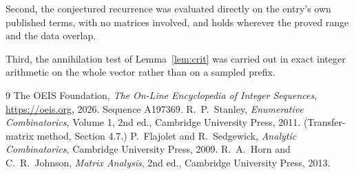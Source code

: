 \documentclass[11pt,a4paper]{article}
\theoremstyle{plain}
\theoremstyle{definition}
\begin{document}
Second, the conjectured recurrence was evaluated directly on the entry's own published terms,
with no matrices involved, and holds wherever the proved range and the data overlap.

Third, the annihilation test of Lemma~\ref{lem:crit} was carried out in exact integer
arithmetic on the whole vector rather than on a sampled prefix.

\begin{thebibliography}{9}
 The OEIS Foundation, \emph{The On-Line Encyclopedia of Integer
Sequences}, \url{https://oeis.org}, 2026. Sequence A197369.
 R.~P.~Stanley, \emph{Enumerative Combinatorics}, Volume 1, 2nd ed.,
Cambridge University Press, 2011. (Transfer-matrix method, Section 4.7.)
 P.~Flajolet and R.~Sedgewick, \emph{Analytic Combinatorics}, Cambridge
University Press, 2009.
 R.~A.~Horn and C.~R.~Johnson, \emph{Matrix Analysis}, 2nd ed., Cambridge
University Press, 2013.
\end{thebibliography}
\end{document}
